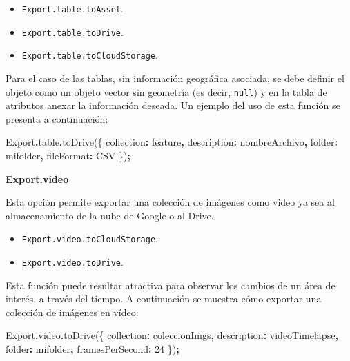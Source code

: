 \documentclass[
  12pt,
  letterpaper,
  twoside]{book}
\newenvironment{Shaded}{\begin{snugshade}}{\end{snugshade}}
\newcommand{\AttributeTok}[1]{\textcolor[rgb]{0.77,0.63,0.00}{#1}}
\newcommand{\DataTypeTok}[1]{\textcolor[rgb]{0.13,0.29,0.53}{#1}}
\newcommand{\DecValTok}[1]{\textcolor[rgb]{0.00,0.00,0.81}{#1}}
\newcommand{\FunctionTok}[1]{\textcolor[rgb]{0.00,0.00,0.00}{#1}}
\newcommand{\NormalTok}[1]{#1}
\newcommand{\OperatorTok}[1]{\textcolor[rgb]{0.81,0.36,0.00}{\textbf{#1}}}
\newcommand{\StringTok}[1]{\textcolor[rgb]{0.31,0.60,0.02}{#1}}
\providecommand{\tightlist}{%
  \setlength{\itemsep}{0pt}\setlength{\parskip}{0pt}}
\begin{document}
\begin{itemize}
\tightlist
\item
  \texttt{Export.table.toAsset}.
\item
  \texttt{Export.table.toDrive}.
\item
  \texttt{Export.table.toCloudStorage}.
\end{itemize}

Para el caso de las tablas, sin información geográfica asociada, se debe definir el objeto como un objeto vector sin geometría (es decir, \texttt{null}) y en la tabla de atributos anexar la información deseada. Un ejemplo del uso de esta función se presenta a continuación:

\begin{Shaded}
\begin{Highlighting}[]
\NormalTok{Export}\OperatorTok{.}\AttributeTok{table}\OperatorTok{.}\FunctionTok{toDrive}\NormalTok{(\{}
    \DataTypeTok{collection}\OperatorTok{:}\NormalTok{ feature}\OperatorTok{,}
    \DataTypeTok{description}\OperatorTok{:} \StringTok{\textquotesingle{}nombreArchivo\textquotesingle{}}\OperatorTok{,}
    \DataTypeTok{folder}\OperatorTok{:} \StringTok{\textquotesingle{}mifolder\textquotesingle{}}\OperatorTok{,}
    \DataTypeTok{fileFormat}\OperatorTok{:} \StringTok{\textquotesingle{}CSV\textquotesingle{}}
\NormalTok{ \})}\OperatorTok{;}
\end{Highlighting}
\end{Shaded}

\textbf{Export.video}

Esta opción permite exportar una colección de imágenes como video ya sea al almacenamiento de la nube de Google o al Drive.

\begin{itemize}
\tightlist
\item
  \texttt{Export.video.toCloudStorage}.
\item
  \texttt{Export.video.toDrive}.
\end{itemize}

Esta función puede resultar atractiva para observar los cambios de un área de interés, a través del tiempo. A continuación se muestra cómo exportar una colección de imágenes en vídeo:

\begin{Shaded}
\begin{Highlighting}[]
\NormalTok{Export}\OperatorTok{.}\AttributeTok{video}\OperatorTok{.}\FunctionTok{toDrive}\NormalTok{(\{}
    \DataTypeTok{collection}\OperatorTok{:}\NormalTok{ coleccionImgs}\OperatorTok{,}
    \DataTypeTok{description}\OperatorTok{:} \StringTok{\textquotesingle{}videoTimelapse\textquotesingle{}}\OperatorTok{,}
    \DataTypeTok{folder}\OperatorTok{:} \StringTok{\textquotesingle{}mifolder\textquotesingle{}}\OperatorTok{,}
    \DataTypeTok{framesPerSecond}\OperatorTok{:} \DecValTok{24}
\NormalTok{ \})}\OperatorTok{;}
\end{Highlighting}
\end{Shaded}
\end{document}
